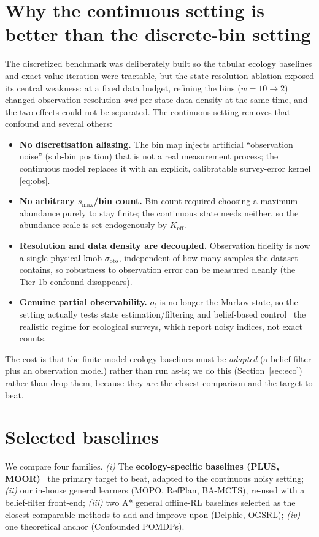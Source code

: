 \documentclass[11pt]{article}
\newcommand{\Keff}{K_{\mathrm{eff}}}
\newcommand{\sobs}{\sigma_{\mathrm{obs}}}
\begin{document}
\section{Why the continuous setting is better than the discrete-bin setting}
The discretized benchmark was deliberately built so the tabular ecology baselines
and exact value iteration were tractable, but the state-resolution ablation
exposed its central weakness: at a fixed data budget, refining the bins
($w{=}10\to2$) changed observation resolution \emph{and} per-state data density at
the same time, and the two effects could not be separated. The continuous setting
removes that confound and several others:
\begin{itemize}[nosep,leftmargin=1.4em]
\item \textbf{No discretisation aliasing.} The bin map injects artificial
``observation noise'' (sub-bin position) that is not a real measurement process;
the continuous model replaces it with an explicit, calibratable survey-error
kernel \eqref{eq:obs}.
\item \textbf{No arbitrary $s_{\max}$/bin count.} Bin count required choosing a
maximum abundance purely to stay finite; the continuous state needs neither, so
the abundance scale is set endogenously by $\Keff$.
\item \textbf{Resolution and data density are decoupled.} Observation fidelity is
now a single physical knob $\sobs$, independent of how many samples the dataset
contains, so robustness to observation error can be measured cleanly (the Tier-1b
confound disappears).
\item \textbf{Genuine partial observability.} $o_t$ is no longer the Markov state,
so the setting actually tests state estimation/filtering and belief-based control
\textemdash\ the realistic regime for ecological surveys, which report noisy
indices, not exact counts.
\end{itemize}
The cost is that the finite-model ecology baselines must be \emph{adapted} (a
belief filter plus an observation model) rather than run as-is; we do this
(Section~\ref{sec:eco}) rather than drop them, because they are the closest
comparison and the target to beat.

\section{Selected baselines}
\label{sec:baselines}
We compare four families. \emph{(i)} The \textbf{ecology-specific baselines (PLUS,
MOOR)} \textemdash\ the primary target to beat, adapted to the continuous noisy
setting; \emph{(ii)} our in-house general learners (MOPO, RefPlan, BA-MCTS),
re-used with a belief-filter front-end; \emph{(iii)} two A* general offline-RL
baselines selected as the closest comparable methods to add and improve upon
(Delphic, OGSRL); \emph{(iv)} one theoretical anchor (Confounded POMDPs).
\end{document}
